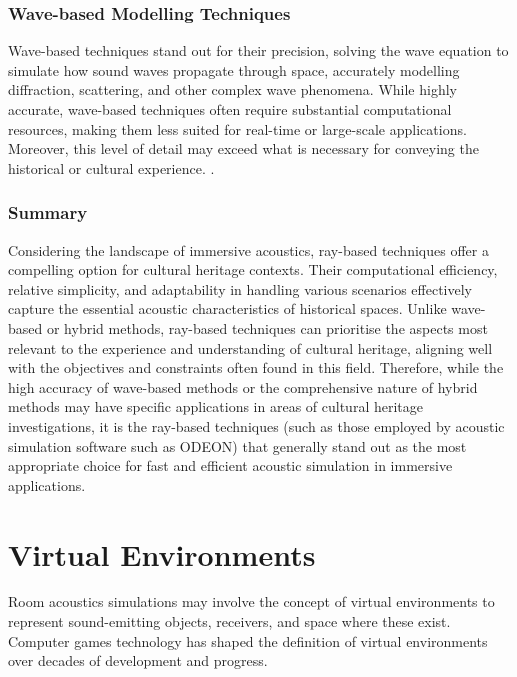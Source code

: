\subsubsection{Wave-based Modelling Techniques}
Wave-based techniques stand out for their precision, solving the wave equation to simulate how sound waves propagate through space, accurately modelling diffraction, scattering, and other complex wave phenomena. While highly accurate, wave-based techniques often require substantial computational resources, making them less suited for real-time or large-scale applications. Moreover, this level of detail may exceed what is necessary for conveying the historical or cultural experience. \cite{hamilton2017fdtd, raghuvanshi2014parametric}.\par

\subsubsection{Summary}
Considering the landscape of immersive acoustics, ray-based techniques offer a compelling option for cultural heritage contexts. Their computational efficiency, relative simplicity, and adaptability in handling various scenarios effectively capture the essential acoustic characteristics of historical spaces. Unlike wave-based or hybrid methods, ray-based techniques can prioritise the aspects most relevant to the experience and understanding of cultural heritage, aligning well with the objectives and constraints often found in this field. Therefore, while the high accuracy of wave-based methods or the comprehensive nature of hybrid methods may have specific applications in areas of cultural heritage investigations, it is the ray-based techniques (such as those employed by acoustic simulation software such as ODEON) that generally stand out as the most appropriate choice for fast and efficient acoustic simulation in immersive applications.

\section{Virtual Environments}
Room acoustics simulations may involve the concept of virtual environments to represent sound-emitting objects, receivers, and space where these exist. Computer games technology has shaped the definition of virtual environments over decades of development and progress.

